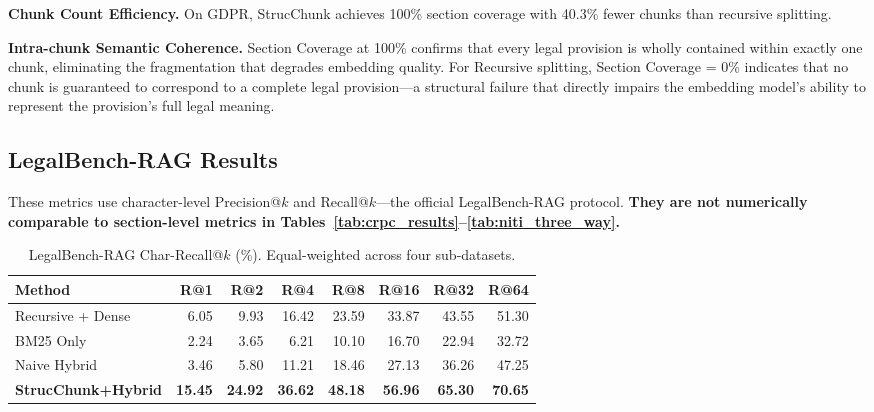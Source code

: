 \documentclass[sn-mathphys,Numbered]{sn-jnl}%
\begin{document}
\textbf{Chunk Count Efficiency.}  On GDPR, StrucChunk achieves 100\%
section coverage with 40.3\% fewer chunks than recursive splitting.

\textbf{Intra-chunk Semantic Coherence.}  Section Coverage at 100\%
confirms that every legal provision is wholly contained within exactly
one chunk, eliminating the fragmentation that degrades embedding quality.
For Recursive splitting, Section Coverage = 0\% indicates that no chunk
is guaranteed to correspond to a complete legal provision---a structural
failure that directly impairs the embedding model's ability to represent
the provision's full legal meaning.

\subsection{LegalBench-RAG Results}

These metrics use character-level Precision@$k$ and Recall@$k$---the
official LegalBench-RAG protocol.  \textbf{They are not numerically
comparable to section-level metrics in
Tables~\ref{tab:crpc_results}--\ref{tab:niti_three_way}.}

\begin{table}[htbp]
\centering
\begin{adjustbox}{max width=\textwidth}
\begin{tabular}{lrrrrrrr}
\toprule
\textbf{Method} & \textbf{R@1} & \textbf{R@2} & \textbf{R@4}
               & \textbf{R@8} & \textbf{R@16} & \textbf{R@32}
               & \textbf{R@64} \\
\midrule
Recursive + Dense      & 6.05  & 9.93  & 16.42 & 23.59 & 33.87 & 43.55 & 51.30 \\
BM25 Only              & 2.24  & 3.65  &  6.21 & 10.10 & 16.70 & 22.94 & 32.72 \\
Naive Hybrid           & 3.46  & 5.80  & 11.21 & 18.46 & 27.13 & 36.26 & 47.25 \\
\textbf{StrucChunk+Hybrid} & \textbf{15.45} & \textbf{24.92}
                       & \textbf{36.62} & \textbf{48.18}
                       & \textbf{56.96} & \textbf{65.30} & \textbf{70.65} \\
\bottomrule
\end{tabular}
\end{adjustbox}
\caption{LegalBench-RAG Char-Recall@$k$ (\%).  Equal-weighted across four sub-datasets.}
\label{tab:lbr_recall}
\end{table}
\end{document}
